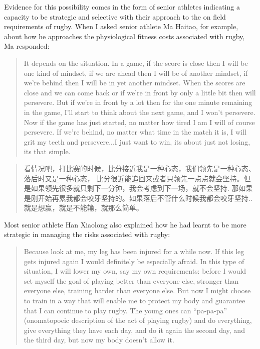 \begin{CJK}{UTF8}{gbsn}
Evidence for this possibility comes in the form of senior athletes indicating a capacity to be strategic and selective with their approach to the on field requirements of rugby.  When I asked senior athlete Ma Haitao, for example, about how he approaches the physiological fitness costs associated with rugby, Ma responded:

    \begin{quote}
      It depends on the situation.  In a game, if the score is close then I will be one kind of mindset, if we are ahead then I will be of another mindset, if we're behind then I will be in yet another mindset.  When the scores are close and we can come back or if we're in front by only a little bit then will persevere.  But if we're in front by a lot then for the one minute remaining in the game, I'll start to think about the next game, and I won't persevere.  Now if the game has just started, no matter how tired I am I will of course persevere. If we're behind, no matter what time in the match it is, I will grit my teeth and persevere...I just want to win, its about just not losing, its that simple.
    \end{quote}

    \begin{quote}
      看情况吧，打比赛的时候，比分接近我是一种心态，我们领先是一种心态、落后时又是一种心态， 比分很近能追回来或者只领先一点点就会坚持。但是如果领先很多就只剩下一分钟，我会考虑到下一场，就不会坚持.  那如果是刚开始再累我都会咬牙坚持的。如果落后不管什么时候我都会咬牙坚持..就是想赢，就是不能输，就那么简单。
    \end{quote}

Most senior athlete Han Xiaolong also explained how he had learnt to be more strategic in managing the risks associated with rugby:

    \begin{quote}
      Because look at me, my leg has been injured for a while now.  If this leg gets injured again I would definitely be especially afraid.  In this type of situation, I will lower my own, say my own requirements: before I would set myself the goal of playing better than everyone else, stronger than everyone else, training harder than everyone else.  But now I might choose to train in a way that will enable me to protect my body and guarantee that I can continue to play rugby.  The young ones can ``pa-pa-pa'' (onomatopoeic description of the act of playing rugby) and do everything, give everything they have each day, and do it again the second day, and the third day, but now my body doesn't allow it.
    \end{quote}


\end{CJK}
